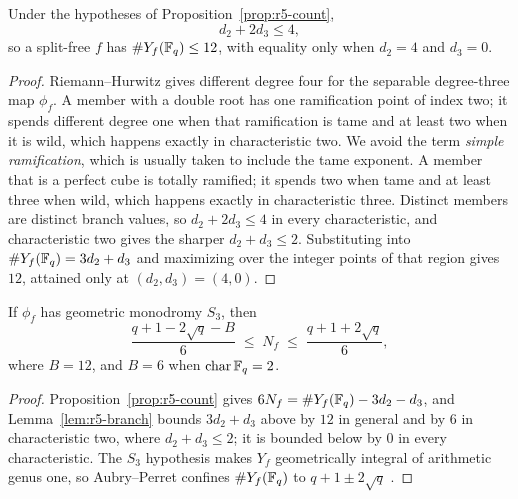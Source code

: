 \begin{lemma}\label{lem:r5-branch}%
%
%
Under the hypotheses of Proposition~\ref{prop:r5-count},
\[
       d_2+2d_3\leq4,
\]
so a split-free $f$ has $\#Y_f(\mathbb F_q)\leq12$, with equality only when
$d_2=4$ and $d_3=0$.
\end{lemma}

\begin{proof}
Riemann--Hurwitz gives different degree four for the separable
degree-three map $\phi_f$.  A member with a double root has one
ramification point of index two; it spends different degree one when
that ramification is tame and at least two when it is wild, which
happens exactly in characteristic two.  We avoid the term \emph{simple
ramification}, which is usually taken to include the tame exponent.  A member that is a perfect cube is totally
ramified; it spends two when tame and at least three when wild, which
happens exactly in characteristic three.  Distinct members are distinct
branch values, so $d_2+2d_3\leq4$ in every characteristic, and
characteristic two gives the sharper $d_2+d_3\leq2$.  Substituting into
\(\#Y_f(\mathbb F_q)=3d_2+d_3\) and maximizing over the integer points of
that region gives $12$, attained only at $(d_2,d_3)=(4,0)$.
\end{proof}

\begin{corollary}\label{cor:r5-equidistribution}%
%
%
If $\phi_f$ has geometric monodromy $S_3$, then
\[
 \frac{q+1-2\sqrt q-B}{6}\;\leq\;N_f\;\leq\;\frac{q+1+2\sqrt q}{6},
\]
where $B=12$, and $B=6$ when $\operatorname{char}\mathbb F_q=2$.
\end{corollary}

\begin{proof}
Proposition~\ref{prop:r5-count} gives $6N_f=\#Y_f(\mathbb F_q)-3d_2-d_3$, and
Lemma~\ref{lem:r5-branch} bounds $3d_2+d_3$ above by $12$ in general and
by $6$ in characteristic two, where $d_2+d_3\leq2$; it is bounded below
by $0$ in every characteristic.  The $S_3$ hypothesis makes $Y_f$
geometrically integral of arithmetic genus one, so Aubry--Perret
confines $\#Y_f(\mathbb F_q)$ to $q+1\pm2\sqrt q$
\cite[p.~468]{AubryPerret1995}.
\end{proof}

